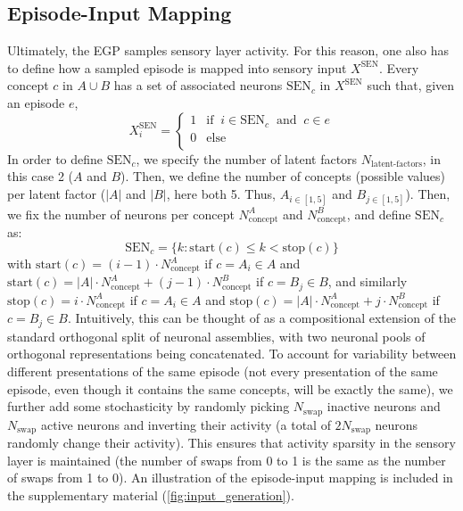 \documentclass{article}
\begin{document}
\subsection*{Episode-Input Mapping}
Ultimately, the EGP samples sensory layer activity. For this reason, one also has to define how a sampled episode is mapped into sensory input $X^\textrm{SEN}$. Every concept $c$ in $A\cup B$ has a set of associated neurons $\textrm{SEN}_{c}$ in $X^\textrm{SEN}$ such that, given an episode $e$,
\begin{equation}
     X^\textrm{SEN}_{i} = \begin{cases} 
      1 & \textrm{if} \;\; i \in \textrm{SEN}_{c} \;\;\textrm{and}\;\; c \in e\\ 
      0 & \textrm{else} \\
   \end{cases}
\end{equation}
In order to define $\textrm{SEN}_c$, we specify the number of latent factors $N_\textrm{latent-factors}$, in this case 2 ($A$ and $B$). Then, we define the number of concepts (possible values) per latent factor ($|A|$ and $|B|$, here both 5. Thus, $A_{i \in [1, 5]}$ and $B_{j \in [1, 5]}$). Then, we fix the number of neurons per concept $N_\textrm{concept}^A$ and $N_\textrm{concept}^B$, and define $\textrm{SEN}_{c}$ as:
\begin{equation}
    \textrm{SEN}_{c} = \{k : \textrm{start}(c) \leq k < \textrm{stop}(c)\}
\end{equation}
with $\textrm{start}(c) = (i - 1) \cdot N_\textrm{concept}^A$ if $c = A_i \in A$ and $\textrm{start}(c) =|A|\cdot N_\textrm{concept}^A + (j - 1) \cdot N_\textrm{concept}^B$ if $c = B_j \in B$, and similarly $\textrm{stop}(c) = i \cdot N_\textrm{concept}^A$ if $c = A_i \in A$ and $\textrm{stop}(c) =|A|\cdot N_\textrm{concept}^A + j \cdot N_\textrm{concept}^B$ if $c = B_j \in B$. Intuitively, this can be thought of as a compositional extension of the standard orthogonal split of neuronal assemblies, with two neuronal pools of orthogonal representations being concatenated.
\newline\newline
To account for variability between different presentations of the same episode (not every presentation of the same episode, even though it contains the same concepts, will be exactly the same), we further add some stochasticity by randomly picking $N_\textrm{swap}$ inactive neurons and $N_\textrm{swap}$ active neurons and inverting their activity (a total of $2N_\textrm{swap}$ neurons randomly change their activity). This ensures that activity sparsity in the sensory layer is maintained (the number of swaps from 0 to 1 is the same as the number of swaps from 1 to 0). An illustration of the episode-input mapping is included in the supplementary material (\ref{fig:input_generation}).
\end{document}
